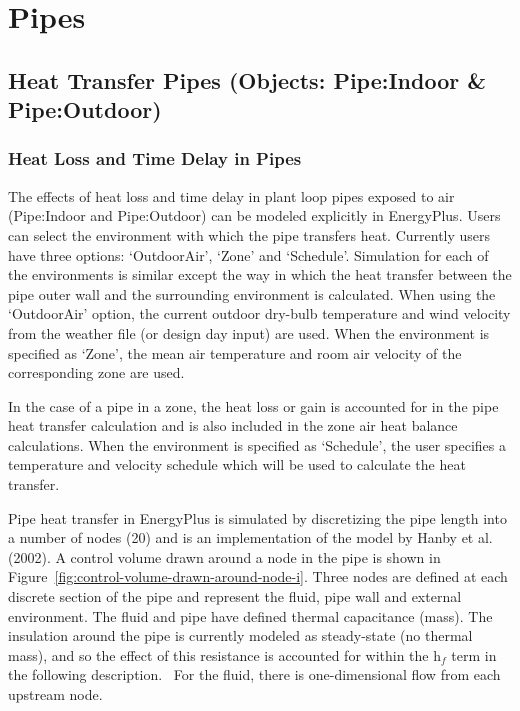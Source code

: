 \section{Pipes }\label{pipes}

\subsection{Heat Transfer Pipes (Objects: Pipe:Indoor \& Pipe:Outdoor)}\label{heat-transfer-pipes-objects-pipeindoor-pipeoutdoor}

\subsubsection{Heat Loss and Time Delay in Pipes}\label{heat-loss-and-time-delay-in-pipes}

The effects of heat loss and time delay in plant loop pipes exposed to air (Pipe:Indoor and Pipe:Outdoor) can be modeled explicitly in EnergyPlus. Users can select the environment with which the pipe transfers heat. Currently users have three options: `OutdoorAir', `Zone' and `Schedule'. Simulation for each of the environments is similar except the way in which the heat transfer between the pipe outer wall and the surrounding environment is calculated. When using the `OutdoorAir' option, the current outdoor dry-bulb temperature and wind velocity from the weather file (or design day input) are used. When the environment is specified as `Zone', the mean air temperature and room air velocity of the corresponding zone are used.

In the case of a pipe in a zone, the heat loss or gain is accounted for in the pipe heat transfer calculation and is also included in the zone air heat balance calculations. When the environment is specified as `Schedule', the user specifies a temperature and velocity schedule which will be used to calculate the heat transfer.

Pipe heat transfer in EnergyPlus is simulated by discretizing the pipe length into a number of nodes (20) and is an implementation of the model by Hanby et al. (2002). A control volume drawn around a node in the pipe is shown in Figure~\ref{fig:control-volume-drawn-around-node-i}. Three nodes are defined at each discrete section of the pipe and represent the fluid, pipe wall and external environment. The fluid and pipe have defined thermal capacitance (mass). The insulation around the pipe is currently modeled as steady-state (no thermal mass), and so the effect of this resistance is accounted for within the h\(_{f}\) term in the following description.~ For the fluid, there is one-dimensional flow from each upstream node.

